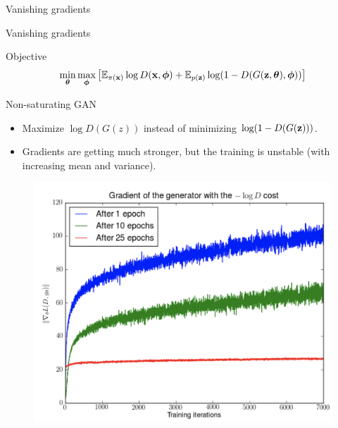 \documentclass{beamer}
\begin{document}
\begin{frame}{Vanishing gradients}
\begin{minipage}[t]{0.5\columnwidth}
\begin{figure}
		\end{figure}
	\end{minipage}
\end{frame}
\begin{frame}{Vanishing gradients}
	\begin{block}{Objective}
		\vspace{-0.4cm}
		\[
		\min_{\boldsymbol{\theta}} \max_{\boldsymbol{\phi}} \left[ \mathbb{E}_{\pi(\mathbf{x})} \log D(\mathbf{x}, \boldsymbol{\phi}) + \mathbb{E}_{p(\mathbf{z})} \log (1 - D(G(\mathbf{z}, \boldsymbol{\theta}), \boldsymbol{\phi})) \right]
		\]
		\vspace{-0.4cm}
	\end{block}
	\begin{minipage}[t]{0.45\columnwidth}
		\begin{block}{Non-saturating GAN}
			\begin{itemize}
				\item Maximize $\log D(G(z))$ instead of minimizing $\log (1 - D(G(\mathbf{z})))$. \\
				\item Gradients are getting much stronger, but the training is unstable (with increasing mean and variance).
			\end{itemize}
		\end{block}
	\end{minipage}%
	\begin{minipage}[t]{0.55\columnwidth}
		\begin{figure}
			\centering
			\includegraphics[width=1.0\linewidth]{figs/vanishing_gradients_3}
		\end{figure}
	\end{minipage}
\end{frame}
\end{document}
